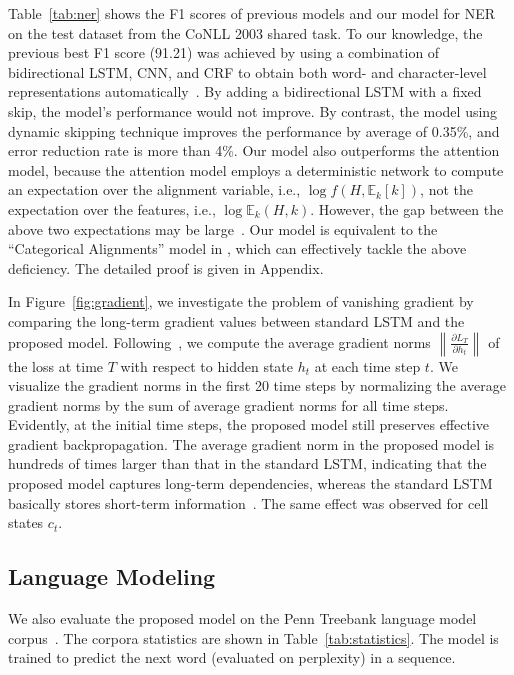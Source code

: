 \documentclass[letterpaper]{article} \usepackage{aaai19}  \usepackage{times}  \usepackage{helvet}  \usepackage{courier}  \usepackage{url}  \usepackage{graphicx}  \usepackage{amsmath}
\begin{document}
Table~\ref{tab:ner} shows the F1 scores of previous models and our model for NER on the test dataset from the CoNLL 2003 shared task. To our knowledge, the previous best F1 score (91.21) was achieved by using a combination of bidirectional LSTM, CNN, and CRF to obtain both word- and character-level representations automatically~\cite{ma2016end}. By adding a bidirectional LSTM with a fixed skip, the model's performance would not improve. By contrast, the model using dynamic skipping technique improves the performance by average of 0.35\%, and error reduction rate is more than 4\%. Our model also outperforms the attention model, because the attention model employs a deterministic network to compute an expectation over the alignment variable, i.e., $\log f(H,\mathbb{E}_k[k])$, not the expectation over the features, i.e., $\log\mathbb{E}_k(H,k)$. However, the gap between the above two expectations may be large~\cite{deng2018latent}. Our model is equivalent to the ``Categorical Alignments'' model in \cite{deng2018latent}, which can effectively tackle the above deficiency. The detailed proof is given in Appendix.



In Figure~\ref{fig:gradient}, we investigate the problem of vanishing gradient by comparing the long-term gradient values between standard LSTM and the proposed model. Following~\cite{mujika2017fast}, we compute the average gradient norms $\left \| \frac{\partial L_T}{\partial h_t} \right \|$ of the loss at time $T$ with respect to hidden state $h_t$ at each time step $t$. We visualize the gradient norms in the first 20 time steps by normalizing the average gradient norms by the sum of average gradient norms for all time steps. Evidently, at the initial time steps, the proposed model still preserves effective gradient backpropagation. The average gradient norm in the proposed model is hundreds of times larger than that in the standard LSTM, indicating that the proposed model captures long-term dependencies, whereas the standard LSTM basically stores short-term information~\cite{mujika2017fast}. The same effect was observed for cell states $c_t$.



\subsection{Language Modeling}
We also evaluate the proposed model on the Penn Treebank language model corpus~\cite{marcus1993building}. The corpora statistics are shown in Table~\ref{tab:statistics}. The model is trained to predict the next word (evaluated on perplexity) in a sequence.
\end{document}
